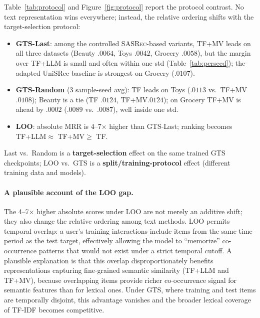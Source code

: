 \documentclass[sigconf,natbib=true,anonymous]{acmart}
\newcommand{\tfidf}{\textsc{TF-IDF}\xspace}
\newcommand{\tfllm}{\textsc{TF+LLM}\xspace}
\newcommand{\tfmv}{\textsc{TF+MV}\xspace}
\newcommand{\base}{\textsc{SASRec}\xspace}
\begin{document}
Table~\ref{tab:protocol} and Figure~\ref{fig:protocol} report the protocol contrast.
No text representation wins everywhere; instead, the relative ordering shifts with the target-selection protocol:

\begin{itemize}[leftmargin=*,itemsep=1pt]
\item \textbf{GTS-Last}: among the controlled \base-based variants, \tfmv leads on all three datasets (Beauty $.0064$, Toys $.0042$, Grocery $.0058$), but the margin over \tfllm is small and often within one std (Table~\ref{tab:perseed}); the adapted UniSRec baseline is strongest on Grocery ($.0107$).
\item \textbf{GTS-Random} (3 sample-seed avg): TF leads on Toys ($.0113$ vs.\ \tfmv $.0108$); Beauty is a tie (TF $.0124$, \tfmv $.0124$); on Grocery \tfmv is ahead by $.0002$ ($.0089$ vs.\ $.0087$), well inside one std.
\item \textbf{LOO}: absolute MRR is 4--7$\times$ higher than GTS-Last; ranking becomes \tfllm $\approx$ \tfmv $\ge$ TF.
\end{itemize}
Last vs.\ Random is a \textbf{target-selection} effect on the same trained GTS checkpoints; LOO vs.\ GTS is a \textbf{split/training-protocol} effect (different training data and models).

\paragraph{A plausible account of the LOO gap.}
The 4--7$\times$ higher absolute scores under LOO are not merely an additive shift; they also change the relative ordering among text methods.
LOO permits temporal overlap: a user's training interactions include items from the same time period as the test target, effectively allowing the model to ``memorize'' co-occurrence patterns that would not exist under a strict temporal cutoff.
A plausible explanation is that this overlap disproportionately benefits representations capturing fine-grained semantic similarity (\tfllm and \tfmv), because overlapping items provide richer co-occurrence signal for semantic features than for lexical ones.
Under GTS, where training and test items are temporally disjoint, this advantage vanishes and the broader lexical coverage of \tfidf becomes competitive.
\end{document}
